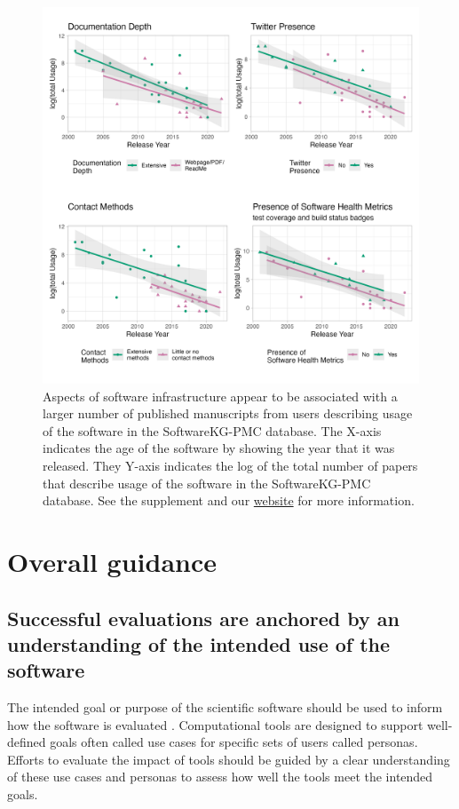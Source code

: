 \documentclass{article}
\begin{document}
\begin{figure}[ht]
    \centering
\includegraphics[width=\textwidth,height=\textheight,keepaspectratio]{images/logUsage_stratified_2x2.png}
    \caption{Aspects of software infrastructure appear to be associated with a larger number of published manuscripts from users describing usage of the software in the SoftwareKG-PMC database. The X-axis indicates the age of the software by showing the year that it was released. They Y-axis indicates the log of the total number of papers that describe usage of the software in the SoftwareKG-PMC database. See the supplement and our \href{https://hutchdatascience.org/ITCR_Metrics_manuscript_website/}{website} for more information.}
    \label{fig:inf_cit}
\end{figure}



\section{Overall guidance}





\subsection{Successful evaluations are anchored by an understanding of the intended use of the software}
\label{sec:use_understanding}
The intended goal or purpose of the scientific software should be used to inform how the software is evaluated \cite{Basili94}. Computational tools are designed to support well-defined goals often called use cases \cite{gamma_design_1995} for specific sets of users called personas\cite{cooper_inmates_2004}. Efforts to evaluate the impact of tools should be guided by a clear understanding of these use cases and personas to assess how well the tools meet the intended goals.
\end{document}
